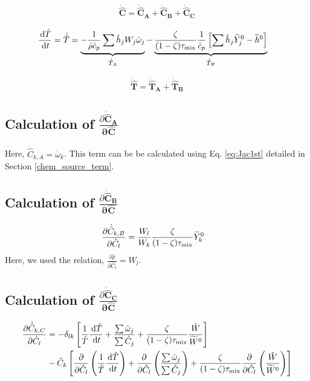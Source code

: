 \begin{align} \label{eq:jspeciemolarconcentration4}
   \boldsymbol{\dot{\hat{C}}} = \boldsymbol{\dot{\hat{C}}_A}+\boldsymbol{\dot{\hat{C}}_B} + \boldsymbol{\dot{\hat{C}}_C}
\end{align}

\begin{align} \label{eq:tempeqn2}
 \frac{\,\mathrm{d} \hat{T} }{\,\mathrm{d} t} &= \dot{\hat{T}} = \underbrace{-\frac{1}{\hat{\rho} \hat{c}_p} \sum{\hat{h}_j W_j \dot{\omega}_j }}_{\dot{\hat{T}}_A}
 -  \underbrace{\frac{\zeta}{(1-\zeta) \tau_{\rm mix}} \frac{1}{\hat{c}_p}  \left[ \sum{\hat{h}_j \widetilde{Y}_j^0} - \widetilde{h}^0 \right]}_{\dot{\hat{T}}_B}
\end{align}

\begin{align} \label{eq:tempeqn4}
   \boldsymbol{\dot{\hat{T}}} = \boldsymbol{\dot{\hat{T}}_A}+\boldsymbol{\dot{\hat{T}}_B}
\end{align}

\subsection*{Calculation of $\frac{\partial \boldsymbol{\dot{\hat{C}}_A}}{\mathbf{\partial \hat{C}}}$}
Here, $\dot{\hat{C}}_{k,A} = \dot{\omega}_{k}$. This term can be be calculated using Eq. \ref{eq:Jac1st} detailed in Section \ref{chem_source_term}.

\subsection*{Calculation of $\frac{\partial \boldsymbol{\dot{\hat{C}}_B}}{\mathbf{\partial \hat{C}}}$}

\begin{align}\label{eq:JacCBC}
\frac{\partial \dot{\hat{C}}_{k,B}}{\partial \hat{C}_{l}} &= \frac{W_l}{W_k} \frac{\zeta}{(1-\zeta) \tau_{\rm mix}} \widetilde{Y}_k^0
\end{align}
Here, we used the relation, $\frac{\partial \hat{\rho}}{\partial \hat{C}_{l}} = W_l$.

\subsection*{Calculation of $\frac{\partial \boldsymbol{\dot{\hat{C}}_C}}{\mathbf{\partial \hat{C}}}$}
\begin{align}\label{eq:JacCCC}
\frac{\partial \dot{\hat{C}}_{k,C}}{\partial \hat{C}_{l}} &= - \delta_{lk} \left[ \frac{1}{\hat{T}} \frac{\,\mathrm{d} \hat{T}}{\,\mathrm{d} t} + \frac{\sum{\dot{\omega}_j}}{\sum{\hat{C}_j}}+\frac{\zeta}{(1-\zeta)\tau_{\rm mix}}\frac{\hat{W}}{\widetilde{W}^0} \right] \notag\\
&- \hat{C}_{k} \left[ \frac{\partial}{\partial \hat{C}_{l}} \left( \frac{1}{\hat{T}} \frac{\,\mathrm{d} \hat{T}}{\,\mathrm{d} t} \right) + \frac{\partial}{\partial \hat{C}_{l}} \left( \frac{\sum{\dot{\omega}_j}}{\sum{\hat{C}_j}}\right) + \frac{\zeta}{(1-\zeta)\tau_{\rm mix}} \frac{\partial}{\partial \hat{C}_{l}} \left( \frac{\hat{W}}{\widetilde{W}^0} \right)\right]
\end{align}

